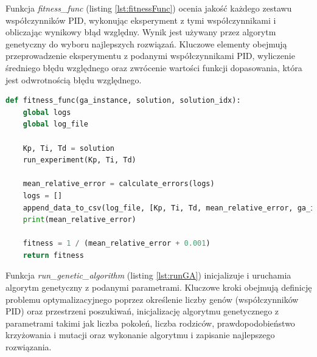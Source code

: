 \documentclass[12pt,twoside]{article}
\begin{document}
Funkcja \textit{fitness\_func} (listing \ref{lst:fitnessFunc}) ocenia jakość każdego zestawu współczynników PID, wykonując eksperyment z tymi współczynnikami i obliczając wynikowy błąd względny. Wynik jest używany przez algorytm genetyczny do wyboru najlepszych rozwiązań. Kluczowe elementy obejmują przeprowadzenie eksperymentu z podanymi współczynnikami PID, wyliczenie średniego błędu względnego oraz zwrócenie wartości funkcji dopasowania, która jest odwrotnością błędu względnego.

\begin{lstlisting}[language=Python, caption=Funkcja dopasowania, label={lst:fitnessFunc}]
def fitness_func(ga_instance, solution, solution_idx):
    global logs
    global log_file

    Kp, Ti, Td = solution
    run_experiment(Kp, Ti, Td)

    mean_relative_error = calculate_errors(logs)
    logs = []
    append_data_to_csv(log_file, [Kp, Ti, Td, mean_relative_error, ga_instance.generations_completed])
    print(mean_relative_error)

    fitness = 1 / (mean_relative_error + 0.001)
    return fitness
\end{lstlisting}

Funkcja \textit{run\_genetic\_algorithm} (listing \ref{lst:runGA}) inicjalizuje i uruchamia algorytm genetyczny z podanymi parametrami. Kluczowe kroki obejmują definicję problemu optymalizacyjnego poprzez określenie liczby genów (współczynników PID) oraz przestrzeni poszukiwań, inicjalizację algorytmu genetycznego z parametrami takimi jak liczba pokoleń, liczba rodziców, prawdopodobieństwo krzyżowania i mutacji oraz wykonanie algorytmu i zapisanie najlepszego rozwiązania.
\end{document}
